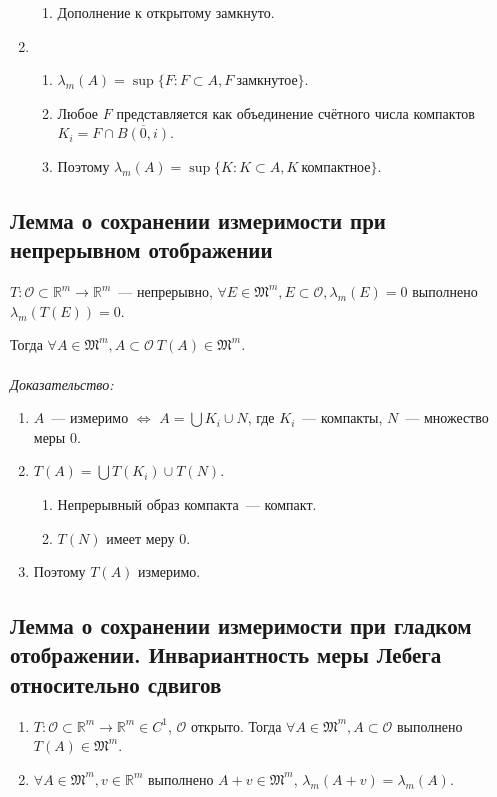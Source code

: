 \documentclass[paper=a4, fontsize=11pt]{article}
\begin{document}
\begin{enumerate}
\begin{enumerate}
        \item Дополнение к открытому замкнуто.
    \end{enumerate}
    \item 
    \begin{enumerate}
        \item $\lambda_m(A) = \sup \{F: F \subset A, F\ \text{замкнутое}\}$.
        \item Любое $F$ представляется как объединение счётного числа компактов $K_i = F \cap \overline{B(0,i)}$.
        \item Поэтому $\lambda_m(A) = \sup \{K: K \subset A, K\ \text{компактное}\}$.
    \end{enumerate}
\end{enumerate}

\subsection{Лемма о сохранении измеримости при непрерывном отображении}
$T: \mathscr{O} \subset \mathds{R}^m \rightarrow \mathds{R}^m$~--- непрерывно,
$\forall E \in \mathfrak{M}^m, E \subset \mathscr{O}, \lambda_m(E)=0$ выполнено
$\lambda_m(T(E)) = 0$.

Тогда $\forall A \in \mathfrak{M}^m,A \subset \mathscr{O}\ T(A) \in \mathfrak{M}^m$.
\\\\
\emph{Доказательство:}
\begin{enumerate}
    \item $A$~--- измеримо $\Leftrightarrow$ $A=\bigcup K_i \cup N$, где $K_i$~--- компакты, $N$~--- множество меры $0$.
    \item $T(A) = \bigcup T(K_i) \cup T(N)$.
    \begin{enumerate}
        \item Непрерывный образ компакта~--- компакт.
        \item $T(N)$ имеет меру 0.
    \end{enumerate}
    \item Поэтому $T(A)$ измеримо.
\end{enumerate}

\subsection{Лемма о сохранении измеримости при гладком отображении. Инвариантность меры Лебега относительно сдвигов}
\begin{enumerate}
    \item $T: \mathscr{O} \subset \mathds{R}^m \rightarrow \mathds{R}^m \in C^1$, $\mathscr{O}$ открыто.
    Тогда $\forall A \in \mathfrak{M}^m,A \subset \mathscr{O}$ выполнено $T(A) \in \mathfrak{M}^m$.
    \item $\forall A \in \mathfrak{M}^m,v \in \mathds{R}^m$ выполнено $A + v \in \mathfrak{M}^m$, $\lambda_m(A+v) = \lambda_m(A)$.
\end{enumerate}
\end{document}
